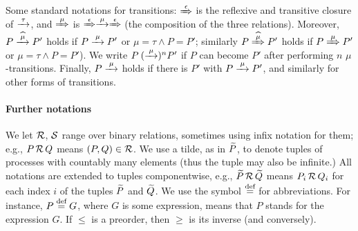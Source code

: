 
Some standard notations for transitions: $\Arr\epsilon$ is the 
reflexive and transitive closure of $\arr\tau$, and 
$\Arr \mu $ is $\Arr\epsilon \arr\mu \Arr\epsilon$ (the
composition of the three relations).
Moreover,   
$P \arcap \mu P'$ holds if $P \arr\mu P'$ or $\mu =\tau \wedge P = P'$; similarly 
$P \Arcap \mu P'$ holds if $P \Arr\mu P'$ or $\mu =\tau \wedge P = P'$).
We write $P \:(\arr\mu)^n P'$ if $P$ can become $P'$ after performing
$n$ $\mu$-transitions. Finally, $P \arr\mu$ holds if there is $P'$
with $P \arr\mu P'$, and similarly for other forms of transitions.

\paragraph{Further notations}
We let $\R$, $\S$ range over binary relations, sometimes using 
 infix notation for them; e.g., 
$P \,\R\, Q$ means $(P,Q) \in \R$.
We use a tilde, as in  $\til P$, to denote tuples of processes with
countably many elements (thus the tuple may also be infinite.)
All notations are extended to tuples componentwise,
e.g., $\til P \,\R\, \til Q$ means $P_i \,\R\, Q_i$ for each  
index $i$ of the tuples $\til P$ and $\til Q$.
We use the symbol $\DSdefi$ for abbreviations. For instance, $P \DSdefi G $, where
$G$ is some expression, means that $P$ stands for the expression $G$.
If $\leq$ is a preorder, then  $\geq$  is its inverse (and
conversely).

